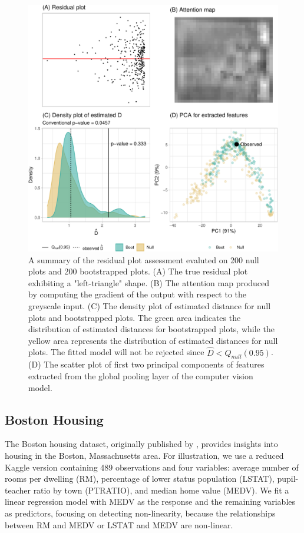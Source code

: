\documentclass[]{interact}
\theoremstyle{plain}%
\theoremstyle{definition}
\theoremstyle{remark}
\begin{document}
\begin{figure}[!h]

{\centering \includegraphics[width=0.8\linewidth]{paper_files/figure-latex/false-check-1} 

}

\caption{A summary of the residual plot assessment evaluted on 200 null plots and 200 bootstrapped plots. (A) The true residual plot exhibiting a "left-triangle" shape. (B) The attention map produced by computing the gradient of the output with respect to the greyscale input.  (C) The density plot of estimated distance for null plots and bootstrapped plots. The green area indicates the distribution of estimated distances for bootstrapped plots, while the yellow area represents the distribution of estimated distances for null plots. The fitted model will not be rejected since $\hat{D} < Q_{null}(0.95)$. (D) The scatter plot of first two principal components of features extracted from the global pooling layer of the computer vision model.  }\label{fig:false-check}
\end{figure}

\subsection{Boston Housing}\label{boston-housing}

The Boston housing dataset, originally published by
\citet{harrison1978hedonic}, provides insights into housing in the
Boston, Massachusetts area. For illustration, we use a reduced Kaggle
version containing 489 observations and four variables: average number
of rooms per dwelling (RM), percentage of lower status population
(LSTAT), pupil-teacher ratio by town (PTRATIO), and median home value
(MEDV). We fit a linear regression model with MEDV as the response and
the remaining variables as predictors, focusing on detecting
non-linearity, because the relationships between RM and MEDV or LSTAT
and MEDV are non-linear.
\end{document}
